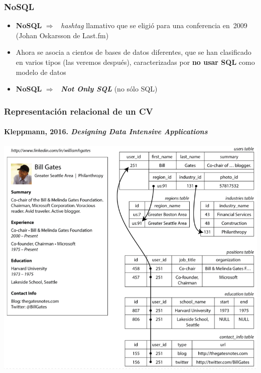 \documentclass[14pt]{beamer}
\newcommand{\ra}{{\color{mdwrojo} $\Rightarrow${}~{}}}
\begin{document}
\begin{frame}
  \frametitle{NoSQL}
\begin{itemize}
\item {\bf NoSQL} \ra{} {\em hashtag\/} llamativo que se
  eligió para una conferencia en~2009 (Johan Oskarsson de Last.fm)
\item Ahora se asocia a cientos de bases de datos diferentes,
  que se han clasificado en varios tipos (las veremos después),
  caracterizadas por {\bf no usar SQL} como modelo de datos
\item {\bf NoSQL} \ra{} {\bfseries\itshape Not Only SQL} (no sólo SQL)
  \end{itemize}
\end{frame}


\begin{frame}
  \frametitle{Representación relacional de un CV}
\framesubtitle{Kleppmann, 2016. \emph{Designing Data Intensive Applications}}
  \centering\includegraphics[height=.81\textheight]{img/gates}
\end{frame}
\end{document}
